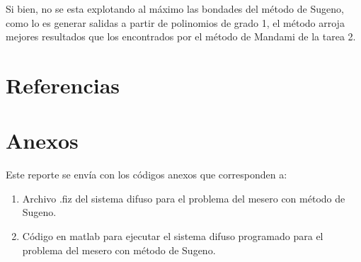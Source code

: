 \documentclass[11pt, letterpaper]{article}
\begin{document}
Si bien, no se esta explotando al máximo las bondades del método de Sugeno, como lo es generar salidas a partir de polinomios de grado 1, el método arroja mejores resultados que los encontrados por el método de Mandami de la tarea 2.

\newpage

\section{Referencias}


\newpage

\section{Anexos}

Este reporte se envía con los códigos anexos que corresponden a:

\begin{enumerate}
	\item Archivo .fiz del sistema difuso para el problema del mesero con método de Sugeno.
	\item Código en matlab para ejecutar el sistema difuso programado para el problema del mesero con método de Sugeno.

\end{enumerate}
\end{document}
